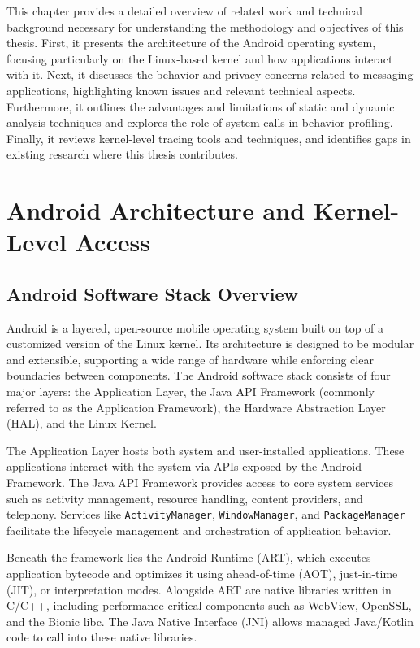 \documentclass[a4paper,12pt]{report}
\begin{document}
This chapter provides a detailed overview of related work and technical background necessary for understanding the methodology and objectives of this thesis. First, it presents the architecture of the Android operating system, focusing particularly on the Linux-based kernel and how applications interact with it. Next, it discusses the behavior and privacy concerns related to messaging applications, highlighting known issues and relevant technical aspects. Furthermore, it outlines the advantages and limitations of static and dynamic analysis techniques and explores the role of system calls in behavior profiling. Finally, it reviews kernel-level tracing tools and techniques, and identifies gaps in existing research where this thesis contributes.
\section{Android Architecture and Kernel-Level Access}

\subsection{Android Software Stack Overview}
Android is a layered, open-source mobile operating system built on top of a customized version of the
Linux kernel. Its architecture is designed to be modular and extensible, supporting a wide range of
hardware while enforcing clear boundaries between components. The Android software stack consists
of four major layers: the Application Layer, the Java API Framework (commonly referred to as the
Application Framework), the Hardware Abstraction Layer (HAL), and the Linux Kernel.

The Application Layer hosts both system and user-installed applications.
These applications interact with the system via APIs exposed by the Android Framework.
The Java API Framework provides access to core system services such as activity management,
resource handling, content providers, and telephony. Services like \texttt{ActivityManager},
\texttt{WindowManager}, and \texttt{PackageManager} facilitate the lifecycle management and
orchestration of application behavior.

Beneath the framework lies the Android Runtime (ART), which executes application bytecode and optimizes it using ahead-of-time (AOT), just-in-time (JIT), or interpretation modes. Alongside ART are native libraries written in C/C++, including performance-critical components such as WebView, OpenSSL, and the Bionic libc. The Java Native Interface (JNI) allows managed Java/Kotlin code to call into these native libraries.
\end{document}

